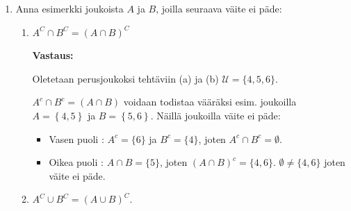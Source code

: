 \documentclass[a4paper,12pt]{article}
\begin{document}
\begin{enumerate}
\textbf{Vastaus:}

Osoitetaan, että $\left(A\cap B\right)^c=A^c\cup B^c$.
\begin{itemize}
    \item $x\in\left(A\cap B\right)^c \Rightarrow x\in A^c\cup B^c$ : Oletetaan, että $x\in\left(A\cap B\right)^c$, eli $x\in\mathcal{U}\setminus \left(A\cap B\right)$. Tällöin $x\notin A \cap B$. Voidakseen olla kuulumatta leikkaukseen, täytyy x:n puuttua jommasta kummasta joukosta A tai B. Täten $x\notin A$ tai $x\in B$. Yhdisteen määritelmän nojalla nyt pätee $x\in A^c$ tai $x\in B^c$, eli 
    \begin{equation*}
        x\in A^c\cup B^c.
    \end{equation*}

    \item $x\in A^c \cup B^c \Rightarrow x\in\left(A\cap B\right)^c$ : Oletetaan, että $x\in A^c\cup B^c$, eli $x\in A^c$ tai $ x\in B^c$. Täten $x\notin A$ tai $x\in B$. Koska x ei kuulu A:han tai B:hen, se ei voi kuulua niiden leikkaukseen, joten 
    \begin{equation*}
        x\in\left(A\cap B\right)^c
    \end{equation*}
    on totta.
\end{itemize}
 
\item Anna esimerkki joukoista $A$ ja $B$‚ joilla seuraava väite ei päde:
 
\begin{enumerate}
\item $A^C\cap B^C=(A\cap B)^C$\vspace{1em}

\textbf{Vastaus:}

Oletetaan perusjoukoksi tehtäviin (a) ja (b) $\mathcal{U}=\{4,5,6\}$.

$A^c\cap B^c = \left(A\cap B\right)$ voidaan todistaa vääräksi esim. joukoilla $A = \left\{4,5\right\}$ ja $B = \left\{5,6\right\}$. Näillä joukoilla väite ei päde:
\begin{itemize}
    \item Vasen puoli : $A^c = \{6\}$ ja $B^c = \{4\}$, joten $A^c\cap B^c = \emptyset$.
    \item Oikea puoli : $A\cap B=\{5\}$, joten $(A\cap B)^c = \{4,6\}$. $\emptyset\not=\{4,6\}$ joten väite ei päde.\vspace{1em}
\end{itemize}

\item $A^C\cup B^C=(A\cup B)^C$.\vspace{1em}


\end{enumerate}
\end{enumerate}
\end{document}
